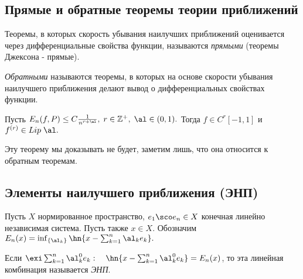 \documentclass{article}
\begin{document}
\subsection{Прямые и обратные теоремы теории приближений}
\begin{df}
  Теоремы, в которых скорость убывания наилучших приближений оценивается через дифференциальные
  свойства функции, называются \emph{прямыми} (теоремы Джексона - прямые).
\end{df}

\begin{df}
  \emph{Обратными} называются теоремы, в
  которых на основе скорости убывания наилучшего приближения делают
  вывод о дифференциальных свойствах функции.
\end{df}

\begin{theorem}[Бернштейн] Пусть $E_n(f,P)\le C
\frac1{n^{r+\al}},\; r\in\mathbb{Z}^{+},\;\al\in(0,1).$
Тогда $f\in C^r[-1,1]$ и \\\hangindent=5cm$f^{(r)}\in
Lip\;\al.$
\end{theorem}
Эту теорему мы доказывать не будет, заметим лишь, что она
относится к обратным теоремам.

\subsection{Элементы наилучшего приближения (ЭНП)}

Пусть $X$ нормированное пространство, $e_1\sco e_n\in X$ конечная линейно независимая система. Пусть также $x\in X$.
Обозначим $E_n(x)=\inf_{\{\al_k\}}\hn{x-\sum_{k=1}^n \al_k e_k}.$

\begin{df}
  Если $\exi\sum_{k=1}^n \al_k^0
  e_k:\quad\hn{x-\sum_{k=1}^n \al_k^0 e_k}=E_n(x)$, то эта
  линейная комбинация называется \emph{ЭНП}.
\end{df}
\end{document}
